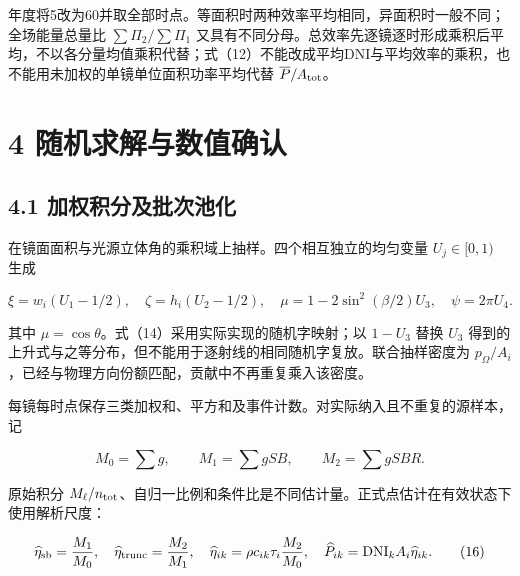 \documentclass[UTF8,fontset=windows,zihao=-4]{ctexart}
\begin{document}
年度将5改为60并取全部时点。等面积时两种效率平均相同，异面积时一般不同；全场能量总量比 \(\sum\Pi_2/\sum\Pi_1\) 又具有不同分母。总效率先逐镜逐时形成乘积后平均，不以各分量均值乘积代替；式（12）不能改成平均DNI与平均效率的乘积，也不能用未加权的单镜单位面积功率平均代替 \(\overline P/A_{\rm tot}\)。

\section*{4 随机求解与数值确认}

\subsection*{4.1 加权积分及批次池化}

\par\noindent\begin{minipage}{\linewidth}
在镜面面积与光源立体角的乘积域上抽样。四个相互独立的均匀变量 \(U_j\in[0,1)\) 生成

\[
\xi=w_i(U_1-1/2),\quad\zeta=h_i(U_2-1/2),\quad
\mu=1-2\sin^2(\beta/2)U_3,\quad\psi=2\pi U_4.
\tag{14}
\]
\end{minipage}\par

其中 \(\mu=\cos\theta\)。式（14）采用实际实现的随机字映射；以 \(1-U_3\) 替换 \(U_3\) 得到的上升式与之等分布，但不能用于逐射线的相同随机字复放。联合抽样密度为 \(p_\Omega/A_i\)，已经与物理方向份额匹配，贡献中不再重复乘入该密度。

\par\noindent\begin{minipage}{\linewidth}
每镜每时点保存三类加权和、平方和及事件计数。对实际纳入且不重复的源样本，记

\[
M_0=\sum g,\qquad M_1=\sum gSB,\qquad M_2=\sum gSBR.
\tag{15}
\]
\end{minipage}\par

\par\noindent\begin{minipage}{\linewidth}
原始积分 \(M_\ell/n_{\rm tot}\)、自归一比例和条件比是不同估计量。正式点估计在有效状态下使用解析尺度：

\[
\widehat\eta_{\rm sb}=\frac{M_1}{M_0},\quad
\widehat\eta_{\rm trunc}=\frac{M_2}{M_1},\quad
\widehat\eta_{ik}=\rho c_{ik}\tau_i\frac{M_2}{M_0},\quad
\widehat P_{ik}=\mathrm{DNI}_kA_i\widehat\eta_{ik}.
\tag{16}
\]
\end{minipage}\par
\end{document}
